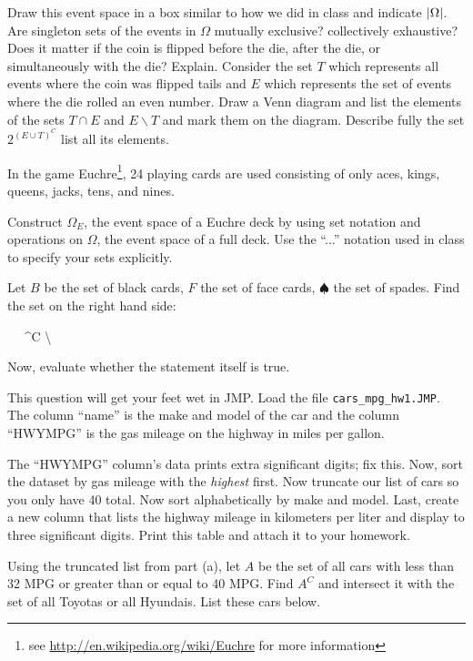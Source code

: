\documentclass[12pt]{article}
\begin{document}
\begin{enumerate}
\easysubproblem Draw this event space in a box similar to how we did in class and indicate $\left|\Omega\right|$.
\easysubproblem Are singleton sets of the events in $\Omega$ mutually exclusive? collectively exhaustive?
\easysubproblem Does it matter if the coin is flipped before the die, after the die, or simultaneously with the die? Explain.
\easysubproblem Consider the set $T$ which represents all events where the coin was flipped tails and $E$ which represents the set of events where the die rolled an even number. Draw a Venn diagram and list the elements of the sets $T \cap E$ and $E \backslash T$ and mark them on the diagram.
\intermediatesubproblem Describe fully the set $2^{(E \cup T)^C}$ \ie list all its elements.

\end{enumerate}

\problem In the game Euchre\footnote{see \url{http://en.wikipedia.org/wiki/Euchre} for more information}, 24 playing cards are used consisting of only aces, kings, queens, jacks, tens, and nines.

\begin{enumerate}
\intermediatesubproblem Construct $\Omega_E$, the event space of a Euchre deck by using set notation and operations on $\Omega$, the event space of a full deck. Use the ``...'' notation used in class to specify your sets explicitly.

\hardsubproblem Let $B$ be the set of black cards, $F$ the set of face cards, $\spadesuit$ the set of spades. Find the set on the right hand side:

\beqn
{} \cup \diameter ~\subseteq~ ^C \backslash \braces{10\spadesuit, 10\clubsuit, 10\heartsuit} \cap \Omega
\eeqn

Now, evaluate whether the statement itself is true.

\end{enumerate}

\problem This question will get your feet wet in JMP. Load the file \texttt{cars\_mpg\_hw1.JMP}.  The column ``name'' is the make and model of the car and the column ``HWYMPG'' is the gas mileage on the highway in miles per gallon.

\begin{enumerate}
\intermediatesubproblem The ``HWYMPG'' column's data prints extra significant digits; fix this. Now, sort the dataset by gas mileage with the \textit{highest} first. Now truncate our list of cars so you only have 40 total. Now sort alphabetically by make and model. Last, create a new column that lists the highway mileage in kilometers per liter and display to three significant digits. Print this table and attach it to your homework.

\intermediatesubproblem Using the truncated list from part (a), let $A$ be the set of all cars with less than 32 MPG or greater than or equal to 40 MPG. Find $A^C$ and intersect it with the set of all Toyotas or all Hyundais. List these cars below.

\end{enumerate}
\end{document}

